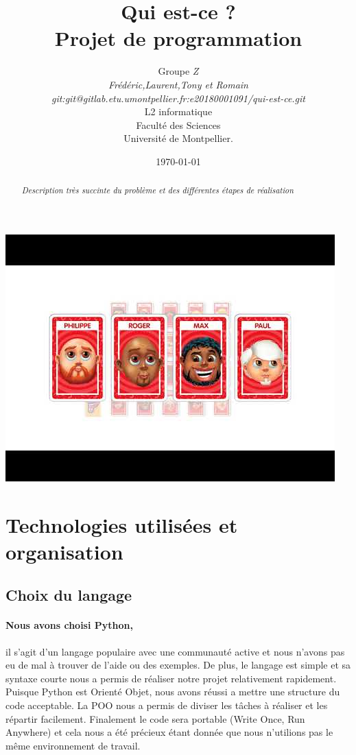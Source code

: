 \documentclass[a4paper]{article}
\title{  Qui est-ce ?\\         %
  Projet de programmation}
\author{Groupe \emph{Z}\\
  \emph{Frédéric,Laurent,Tony et Romain}\\
  \emph{git:git@gitlab.etu.umontpellier.fr:e20180001091/qui-est-ce.git}\\
  L2 informatique\\
  Faculté des Sciences\\
Université de Montpellier.}
\date{\today}
\begin{document}
\maketitle                    %

\begin{center}               %
  \includegraphics[scale=1]{img.jpg}   %
\end{center}

\begin{abstract}     %

  \emph{Description très succinte du problème et des différentes étapes de réalisation}

\end{abstract}



\section{Technologies utilisées  et organisation}



\subsection{Choix du langage}
\paragraph*{Nous avons choisi Python,} il s'agit d'un langage populaire avec une communauté active et nous n'avons pas eu de mal à trouver de l'aide ou des exemples.
De plus, le langage est simple et sa syntaxe courte nous a permis de réaliser notre projet relativement rapidement.
Puisque Python est Orienté Objet, nous avons réussi a mettre une structure du code acceptable.
La POO nous a permis de diviser les tâches à réaliser et les répartir facilement.
Finalement le code sera portable (Write Once, Run Anywhere) et cela nous a été précieux étant donnée que nous n'utilions pas le même environnement de travail.
\end{document}
